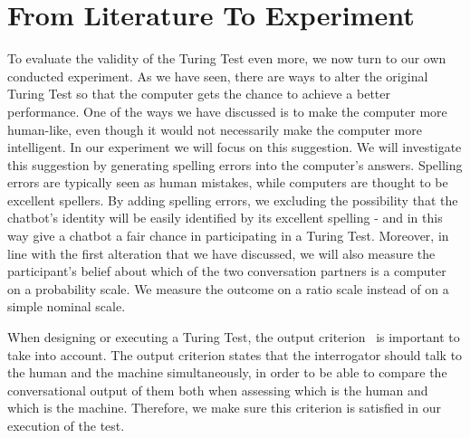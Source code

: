 \section{From Literature To Experiment}
To evaluate the validity of the Turing Test even more, we now turn to our own conducted experiment. As we have seen, there are ways to alter the original Turing Test so that the computer gets the chance to achieve a better performance. One of the ways we have discussed is to make the computer more human-like, even though it would not necessarily make the computer more intelligent. In our experiment we will focus on this suggestion. We will investigate this suggestion by generating spelling errors into the computer’s answers. Spelling errors are typically seen as human mistakes, while computers are thought to be excellent spellers. By adding spelling errors, we excluding the possibility that the chatbot’s identity will be easily identified by its excellent spelling - and in this way give a chatbot a fair chance in participating in a Turing Test. Moreover, in line with the first alteration that we have discussed, we will also measure the participant’s belief about which of the two conversation partners is a computer on a probability scale. We measure the outcome on a ratio scale instead of on a simple nominal scale.

When designing or executing a Turing Test, the output criterion~\cite{copeland2015artificial} is important to take into account. The output criterion states that the interrogator should talk to the human and the machine simultaneously, in order to be able to compare the conversational output of them both when assessing which is the human and which is the machine. Therefore, we make sure this criterion is satisfied in our execution of the test.

